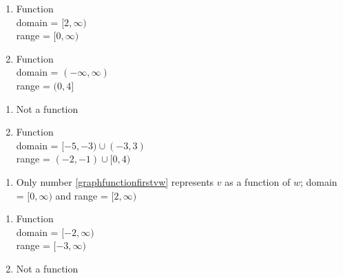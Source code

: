 \documentclass{ximera}
\begin{document}
\begin{enumerate}

\item Function \\ domain = $[2, \infty)$ \\ range = $[0, \infty)$

 

 

\item Function \\ domain = $(-\infty, \infty)$ \\ range = $(0, 4]$

\end{enumerate}



\begin{enumerate}

\item Not a function


 

 

\item Function \\ domain = $[-5,-3) \cup(-3, 3)$ \\ range = $(-2, -1) \cup [0, 4)$

\end{enumerate}


\begin{enumerate}

\item Only number \ref{graphfunctionfirstvw} represents $v$ as a function of $w$;  domain = $[0, \infty)$ and range = $[2, \infty)$

\end{enumerate}



\begin{enumerate}

\item  Function \\  domain =  $[-2, \infty)$ \\ range = $[-3, \infty)$

 

 

\item Not a function

\end{enumerate}
\end{document}
